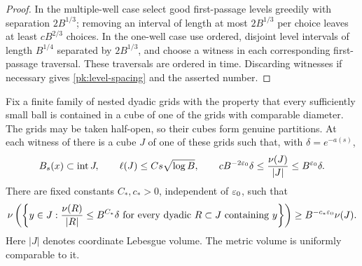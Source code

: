 \begin{proof}
In the multiple-well case select good first-passage levels
greedily with separation $2B^{1/3}$; removing an interval of
length at most $2B^{1/3}$ per choice leaves at least $cB^{2/3}$
choices.  In the one-well case use ordered, disjoint level
intervals of length $B^{1/4}$ separated by $2B^{1/3}$, and choose
a witness in each corresponding first-passage traversal.
These traversals are ordered in time.  Discarding witnesses if
necessary gives \eqref{pk:level-spacing} and the asserted number.
\end{proof}

\begin{lemma}\label{pk:reverse}
Fix a finite family of nested dyadic grids with the property that
every sufficiently small ball is contained in a cube of one of
the grids with comparable diameter.  The grids may be taken
half-open, so their cubes form genuine partitions.
At each witness of  there is a cube $J$ of
one of these grids such that, with $\delta=e^{-a(s)}$,
\begin{equation}\label{pk:cube-range}
 B_s(x)\subset\operatorname{int}J,\qquad
 \ell(J)\le C s\sqrt{\log B},\qquad
 cB^{-2\varepsilon_0}\delta\le\frac{\nu(J)}{|J|}
       \le B^{\varepsilon_0}\delta.
\end{equation}
There are fixed constants $C_*,c_*>0$, independent of
$\varepsilon_0$, such that
\begin{equation}\label{pk:reverse-fraction}
 \nu\left(\left\{y\in J:
    \frac{\nu(R)}{|R|}\le B^{C_*}\delta
    \text{ for every dyadic }R\subset J\text{ containing }y
    \right\}\right)
 \ge B^{-c_*\varepsilon_0}\nu(J).
\end{equation}
Here $|J|$ denotes coordinate Lebesgue volume.  The metric volume
is uniformly comparable to it.
\end{lemma}

